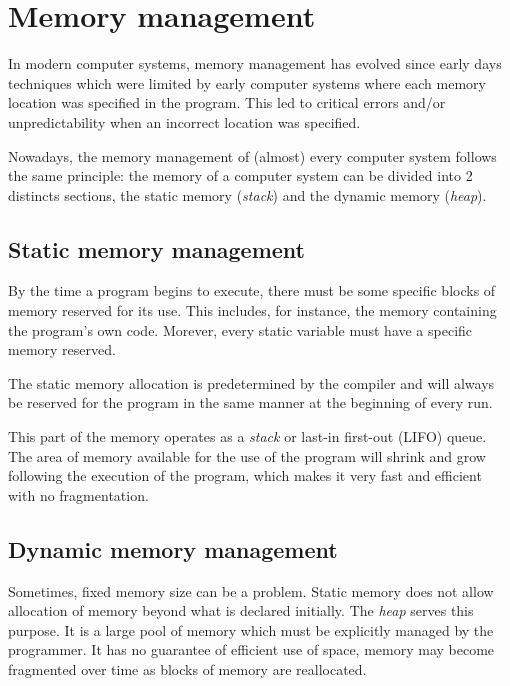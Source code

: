 \section{Memory management}


In modern computer systems, memory management has evolved since early days techniques which were limited
    by early computer systems where each memory location was specified in the program.
This led to critical errors and/or unpredictability when an incorrect location was specified.

Nowadays, the memory management of (almost) every computer system follows the same principle:
the memory of a computer system can be divided into 2 distincts sections,
    the static memory (\textit{stack}) and the dynamic memory (\textit{heap}).

\subsection{Static memory management}
By the time a program begins to execute, there must be some specific blocks of memory reserved for its use.
This includes, for instance, the memory containing the program's own code.
Morever, every static variable must have a specific memory reserved.

The static memory allocation is predetermined by the compiler
    and will always be reserved for the program in the same manner at the beginning of every run.

This part of the memory operates as a \textit{stack} or last-in first-out (LIFO) queue.
The area of memory available for the use of the program will shrink and grow following the execution of the program,
which makes it very fast and efficient with no fragmentation.

\subsection{Dynamic memory management}
Sometimes, fixed memory size can be a problem.
Static memory does not allow allocation of memory beyond what is declared initially.
The \textit{heap} serves this purpose.
It is a large pool of memory which must be explicitly managed by the programmer.
It has no guarantee of efficient use of space, memory may become fragmented over time as blocks of memory are reallocated.

